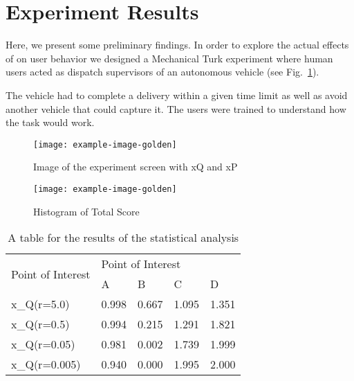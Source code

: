 \section{Experiment Results} \label{sec:exp_results}
Here, we present some preliminary findings. In order to explore the actual effects of \famsec on user behavior we designed a Mechanical Turk experiment where human users acted as dispatch supervisors of an autonomous vehicle (see Fig.~\ref{fig:experiment}). 

The vehicle had to complete a delivery within a given time limit as well as avoid another vehicle that could capture it. The users were trained to understand how the task would work.

\begin{figure}[tbp]
    \centering
    \texttt{[image: example-image-golden]}
    \label{fig:experiment}
    \caption{Image of the experiment screen with xQ and xP}
\end{figure}

\begin{figure}[tbp]
    \centering
    \texttt{[image: example-image-golden]}
    \label{fig:total_score}
    \caption{Histogram of Total Score}
\end{figure}

\begin{table}[]
\caption{A table for the results of the statistical analysis}
\label{tab:results}
\begin{tabular}{lllll}
\hline
\multirow{2}{*}{Point of Interest} & \multicolumn{4}{l}{Point of Interest} \\ \cline{2-5} 
 & A & B & C & D \\ \cline{1-1}
x\_Q(r=5.0) & 0.998 & 0.667 & 1.095 & 1.351 \\
x\_Q(r=0.5) & 0.994 & 0.215 & 1.291 & 1.821 \\
x\_Q(r=0.05) & 0.981 & 0.002 & 1.739 & 1.999 \\
x\_Q(r=0.005) & 0.940 & 0.000 & 1.995 & 2.000 \\ \hline
\end{tabular}
\end{table}
